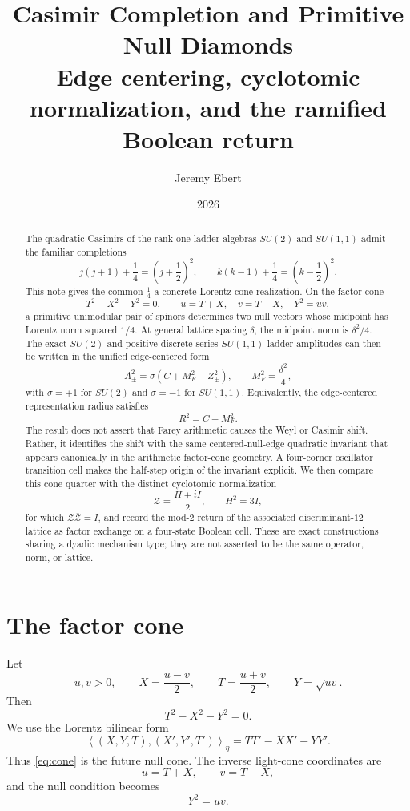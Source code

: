 \documentclass[11pt]{article}
\title{\textbf{Casimir Completion and Primitive Null Diamonds}\\
\large Edge centering, cyclotomic normalization, and the ramified Boolean return}
\author{Jeremy Ebert}
\date{2026}
\theoremstyle{remark}
\newcommand{\ip}[2]{\left\langle #1,#2\right\rangle_\eta}
\begin{document}
\maketitle

\begin{abstract}
The quadratic Casimirs of the rank-one ladder algebras $SU(2)$ and $SU(1,1)$ admit the familiar completions
\[
j(j+1)+\frac14=\left(j+\frac12\right)^2,
\qquad
k(k-1)+\frac14=\left(k-\frac12\right)^2.
\]
This note gives the common $\tfrac14$ a concrete Lorentz-cone realization.  On the factor cone
\[
T^2-X^2-Y^2=0,
\qquad
u=T+X,\quad v=T-X,\quad Y^2=uv,
\]
a primitive unimodular pair of spinors determines two null vectors whose midpoint has Lorentz norm squared $1/4$.  At general lattice spacing $\delta$, the midpoint norm is $\delta^2/4$.  The exact $SU(2)$ and positive-discrete-series $SU(1,1)$ ladder amplitudes can then be written in the unified edge-centered form
\[
A_\pm^2
=
\sigma\left(C+M_F^2-Z_\pm^2\right),
\qquad
M_F^2=\frac{\delta^2}{4},
\]
with $\sigma=+1$ for $SU(2)$ and $\sigma=-1$ for $SU(1,1)$.  Equivalently, the edge-centered representation radius satisfies
\[
R^2=C+M_F^2.
\]
The result does not assert that Farey arithmetic causes the Weyl or Casimir shift.  Rather, it identifies the shift with the same centered-null-edge quadratic invariant that appears canonically in the arithmetic factor-cone geometry.  A four-corner oscillator transition cell makes the half-step origin of the invariant explicit.  We then compare this cone quarter with the distinct cyclotomic normalization
\[
\mathcal Z=\frac{H+iI}{2},\qquad H^2=3I,
\]
for which $\mathcal Z\overline{\mathcal Z}=I$, and record the mod-$2$ return of the associated discriminant-$12$ lattice as factor exchange on a four-state Boolean cell.  These are exact constructions sharing a dyadic mechanism type; they are not asserted to be the same operator, norm, or lattice.
\end{abstract}

\section{The factor cone}

Let
\[
u,v>0,\qquad
X=\frac{u-v}{2},\qquad
T=\frac{u+v}{2},\qquad
Y=\sqrt{uv}.
\]
Then
\begin{equation}
\boxed{T^2-X^2-Y^2=0.}
\label{eq:cone}
\end{equation}
We use the Lorentz bilinear form
\[
\ip{(X,Y,T)}{(X',Y',T')}
=
TT'-XX'-YY'.
\]
Thus \eqref{eq:cone} is the future null cone.  The inverse light-cone coordinates are
\[
u=T+X,\qquad v=T-X,
\]
and the null condition becomes
\[
Y^2=uv.
\]
\end{document}
